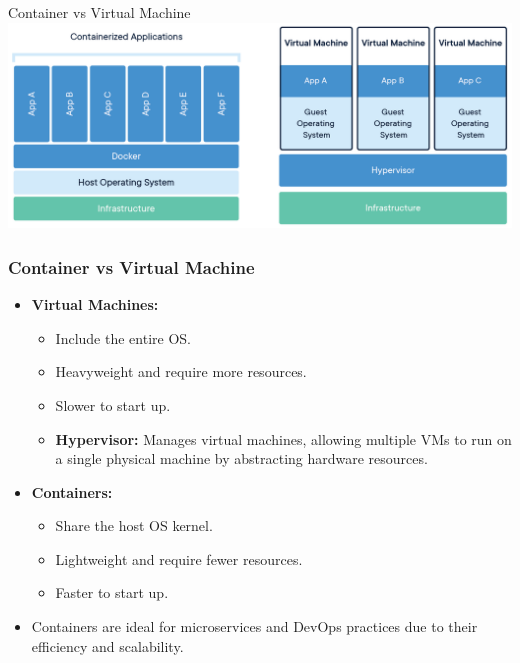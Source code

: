 \documentclass[aspectratio=169, table]{beamer}
\begin{document}
    \begin{frame}{Container vs Virtual Machine}
        \vspace{30pt}
        \includegraphics[width=\textwidth]{../../images/container-vm.png}
    \end{frame}


    \begin{frame}
        \frametitle{Container vs Virtual Machine}
        \vspace{25pt}
        \begin{itemize}
            \item \textbf{Virtual Machines:}
            \begin{itemize}
                \item Include the entire OS.
                \item Heavyweight and require more resources.
                \item Slower to start up.
                \item \textbf{Hypervisor:} Manages virtual machines, allowing multiple VMs to run on a single physical machine by abstracting hardware resources.
            \end{itemize}
            \item \textbf{Containers:}
            \begin{itemize}
                \item Share the host OS kernel.
                \item Lightweight and require fewer resources.
                \item Faster to start up.
            \end{itemize}
            \item Containers are ideal for microservices and DevOps practices due to their efficiency and scalability.
        \end{itemize}
    \end{frame}
\end{document}

